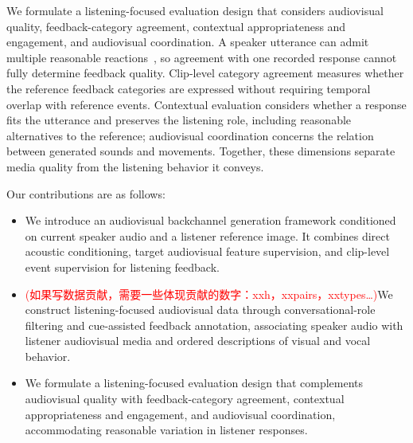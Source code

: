 We formulate a listening-focused evaluation design that considers
audiovisual quality, feedback-category agreement, contextual
appropriateness and engagement, and audiovisual coordination. A speaker
utterance can admit multiple reasonable reactions~\cite{learningtolisten,reactface},
so agreement with one recorded response cannot fully determine feedback
quality. Clip-level category agreement measures whether the reference
feedback categories are expressed without requiring temporal overlap with
reference events. Contextual evaluation considers whether a response fits
the utterance and preserves the listening role, including reasonable
alternatives to the reference; audiovisual coordination concerns the
relation between generated sounds and movements. Together, these
dimensions separate media quality from the listening behavior it conveys.

Our contributions are as follows:
\begin{itemize}
    \item We introduce an audiovisual backchannel generation framework
    conditioned on current speaker audio and a listener reference image.
    It combines direct acoustic conditioning, target audiovisual feature
    supervision, and clip-level event supervision for listening feedback.

    \item \textcolor{red}{(如果写数据贡献，需要一些体现贡献的数字：xxh，xxpairs，xxtypes…)}We construct listening-focused audiovisual data through
    conversational-role filtering and cue-assisted feedback annotation,
    associating speaker audio with listener audiovisual media and ordered
    descriptions of visual and vocal behavior.

    \item We formulate a listening-focused evaluation design that
    complements audiovisual quality with feedback-category agreement,
    contextual appropriateness and engagement, and audiovisual
    coordination, accommodating reasonable variation in listener responses.
\end{itemize}





